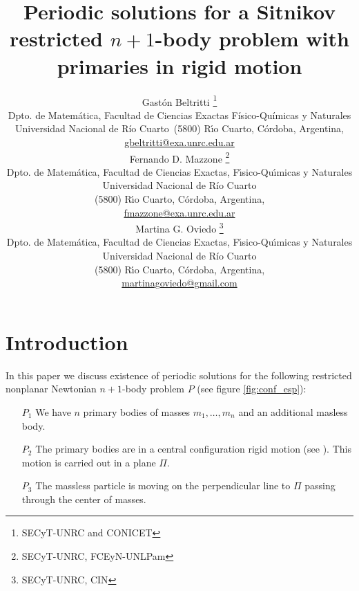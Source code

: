 \documentclass[twoside]{article}
\title{Periodic solutions for a Sitnikov restricted $n+1$-body problem with primaries in rigid motion}
\author{Gast\'on Beltritti \thanks{SECyT-UNRC and CONICET}\\
Dpto. de Matem\'atica, Facultad de Ciencias Exactas Físico-Químicas y Naturales\\
Universidad Nacional de R\'{i}o Cuarto\
(5800) R\'{\i}o Cuarto, C\'ordoba, Argentina,\\
\url{gbeltritti@exa.unrc.edu.ar}\\[3mm]
Fernando D. Mazzone \thanks{SECyT-UNRC, FCEyN-UNLPam}\\
Dpto. de Matem\'atica, Facultad de Ciencias Exactas, F\'{\i}sico-Qu\'{\i}micas y Naturales\\
Universidad Nacional de R\'{i}o Cuarto\\
(5800) R\'{\i}o Cuarto, C\'ordoba, Argentina,\\
\url{fmazzone@exa.unrc.edu.ar}\\
Martina G. Oviedo \thanks{SECyT-UNRC, CIN}\\
Dpto. de Matem\'atica, Facultad de Ciencias Exactas, F\'{\i}sico-Qu\'{\i}micas y Naturales\\
Universidad Nacional de R\'{i}o Cuarto\\
(5800) R\'{\i}o Cuarto, C\'ordoba, Argentina,\\
\url{martinagoviedo@gmail.com}
}
\date{}
\theoremstyle{remark}
\begin{document}
\maketitle
%
%
%
%
%

\begin{abstract}


\end{abstract}




\pagestyle{fancy} \headheight 35pt \fancyhead{} \fancyfoot{}

\fancyfoot[C]{\thepage}  \fancyhead[CO]{\nouppercase{\section}}

\fancyhead[CO]{\nouppercase{\leftmark}}






\section{Introduction}
In this paper we discuss existence of periodic solutions for the following restricted nonplanar Newtonian $n+1$-body problem $P$ (see figure \ref{fig:conf_esp}):
\begin{itemize}
 \item[$P_1$] We have $n$ primary bodies of masses $m_1,\ldots,m_n$ and an additional masless body.
 \item[$P_2$] The primary bodies are in a central  configuration rigid motion (see \cite[Section 2.9]{JaumeLlibre276}). This motion is carried out in a plane $\Pi$.
 \item[$P_3$] The massless particle is moving on the perpendicular line to $\Pi$ passing through the center of masses.
\end{itemize}
\end{document}
